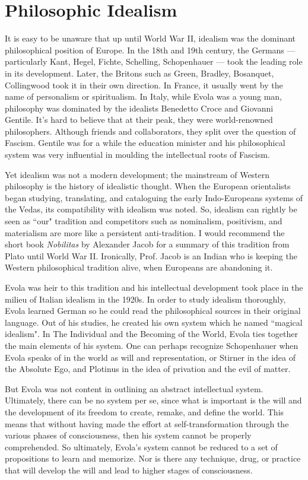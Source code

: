\section{Philosophic Idealism}

It is easy to be unaware that up until World War II, idealism was the dominant philosophical position of Europe. In the 18th and 19th century, the Germans — particularly Kant, Hegel, Fichte, Schelling, Schopenhauer — took the leading role in its development. Later, the Britons such as Green, Bradley, Bosanquet, Collingwood took it in their own direction. In France, it usually went by the name of personalism or spiritualism. In Italy, while Evola was a young man, philosophy was dominated by the idealists Benedetto Croce and Giovanni Gentile. It's hard to believe that at their peak, they were world-renowned philosophers. Although friends and collaborators, they split over the question of Fascism. Gentile was for a while the education minister and his philosophical system was very influential in moulding the intellectual roots of Fascism.

Yet idealism was not a modern development; the mainstream of Western philosophy is the history of idealistic thought. When the European orientalists began studying, translating, and cataloguing the early Indo-Europeans systems of the Vedas, its compatibility with idealism was noted. So, idealism can rightly be seen as ``our" tradition and competitors such as nominalism, positivism, and materialism are more like a persistent anti-tradition. I would recommend the short book \textit{Nobilitas} by Alexander Jacob for a summary of this tradition from Plato until World War II. Ironically, Prof. Jacob is an Indian who is keeping the Western philosophical tradition alive, when Europeans are abandoning it.

Evola was heir to this tradition and his intellectual development took place in the milieu of Italian idealism in the 1920s. In order to study idealism thoroughly, Evola learned German so he could read the philosophical sources in their original language. Out of his studies, he created his own system which he named ``magical idealism". In The Individual and the Becoming of the World, Evola ties together the main elements of his system. One can perhaps recognize Schopenhauer when Evola speaks of in the world as will and representation, or Stirner in the idea of the Absolute Ego, and Plotinus in the idea of privation and the evil of matter.

But Evola was not content in outlining an abstract intellectual system. Ultimately, there can be no system per se, since what is important is the will and the development of its freedom to create, remake, and define the world. This means that without having made the effort at self-transformation through the various phases of consciousness, then his system cannot be properly comprehended. So ultimately, Evola's system cannot be reduced to a set of propositions to learn and memorize. Nor is there any technique, drug, or practice that will develop the will and lead to higher stages of consciousness.

